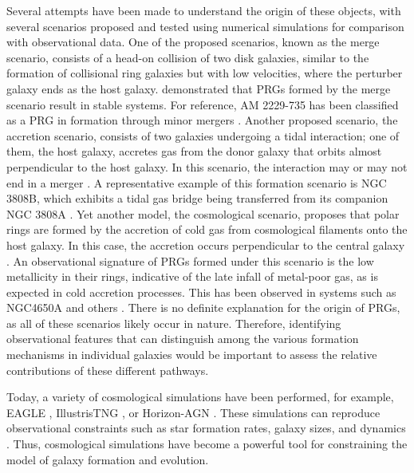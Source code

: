 \documentclass[fleqn,usenatbib]{mnras}
\begin{document}
Several attempts have been made to understand the origin of these objects, with several scenarios proposed and tested using numerical simulations for comparison with observational data.
One of the proposed scenarios, known as the merge scenario, consists of a head-on collision of two disk galaxies, similar to the formation of collisional ring galaxies but with low velocities, where the perturber galaxy ends as the host galaxy. \cite{1997_Bekki,1998_Bekki} demonstrated that PRGs formed by the merge scenario result in stable systems. For reference, AM 2229-735 has been classified as a PRG in formation through minor mergers \citep{2020_Quiroga}. Another proposed scenario, the accretion scenario, consists of two galaxies undergoing a tidal interaction; one of them, the host galaxy, accretes gas from the donor galaxy that orbits almost perpendicular to the host galaxy. In this scenario, the interaction may or may not end in a merger \citep{1983_Schweizer,1997_Reshetnikov,2003_Bournaud}. A representative example of this formation scenario is NGC 3808B, which exhibits a tidal gas bridge being transferred from its companion NGC 3808A \citep{1996_Reshetnikov, 2016_Ordenes-Briceno}. Yet another model, the cosmological scenario, proposes that polar rings are formed by the accretion of cold gas from cosmological filaments onto the host galaxy. In this case, the accretion occurs perpendicular to the central galaxy \citep{2006_Maccio,2008_Brook,2012_Snaith}. An observational signature of PRGs formed under this scenario is the low metallicity in their rings, indicative of the late infall of metal-poor gas, as is expected in cold accretion processes. This has been observed in systems such as NGC4650A \citep{2010_Spavone} and others \citep[eg. UGC 7576, UGC 9796 or  IIZw71;][]{2011_Spavone, 2019_Egorov}.
There is no definite explanation for the origin of PRGs, as all of these scenarios likely occur in nature. Therefore, identifying observational features that can distinguish among the various formation mechanisms in individual galaxies would be important to assess the relative contributions of these different pathways.

Today, a variety of cosmological simulations have been performed, for example, EAGLE \citep{2015_Crain,2015_Schaye}, IllustrisTNG \citep{Pillepich_2019, Nelson_2019}, or Horizon-AGN \citep{2014_Dubois}. These simulations can reproduce observational constraints such as star formation rates, galaxy sizes, and dynamics \citep{2018_Nelso, Genel_2017, Pillepich_2019}. Thus, cosmological simulations have become a powerful tool for constraining the model of galaxy formation and evolution. 
\end{document}
